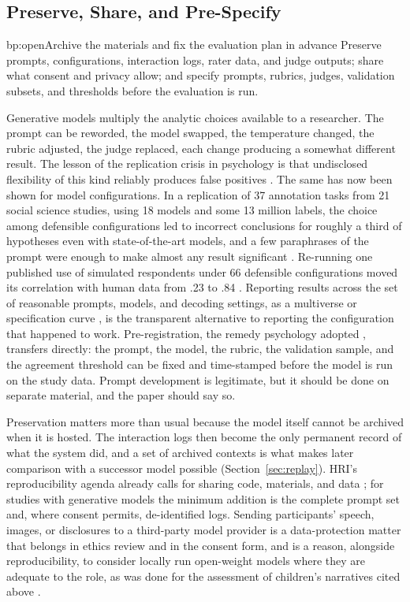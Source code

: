 \subsection{Preserve, Share, and Pre-Specify}

\begin{practice}{bp:open}{Archive the materials and fix the evaluation plan in advance}
Preserve prompts, configurations, interaction logs, rater data, and judge
outputs; share what consent and privacy allow; and specify prompts, rubrics,
judges, validation subsets, and thresholds before the evaluation is run.
\end{practice}

Generative models multiply the analytic choices available to a researcher.
The prompt can be reworded, the model swapped, the temperature changed, the
rubric adjusted, the judge replaced, each change producing a somewhat
different result. The lesson of the replication crisis in psychology is that
undisclosed flexibility of this kind reliably produces false positives
\cite{simmons2011falsepositive}. The same has now been shown for model
configurations. In a replication of 37 annotation tasks from 21 social
science studies, using 18 models and some 13 million labels, the choice
among defensible configurations led to incorrect conclusions for roughly a
third of hypotheses even with state-of-the-art models, and a few
paraphrases of the prompt were enough to make almost any result significant
\cite{baumann2025large}. Re-running one published use of simulated
respondents under 66 defensible configurations moved its correlation with
human data from .23 to .84 \cite{cummins2026threat}. Reporting results
across the set of reasonable prompts, models, and decoding settings, as a
multiverse or specification curve
\cite{steegen2016increasing,simonsohn2020specification}, is the transparent
alternative to reporting the configuration that happened to work.
Pre-registration, the remedy psychology adopted \cite{nosek2018preregistration},
transfers directly: the prompt, the model, the rubric, the validation sample,
and the agreement threshold can be fixed and time-stamped before the model is
run on the study data. Prompt development is legitimate, but it should be
done on separate material, and the paper should say so.

Preservation matters more than usual because the model itself cannot be
archived when it is hosted. The interaction logs then become the only
permanent record of what the system did, and a set of archived contexts is
what makes later comparison with a successor model possible
(Section~\ref{sec:replay}). HRI's reproducibility agenda already calls for
sharing code, materials, and data \cite{gunes2022reproducibility}; for
studies with generative models the minimum addition is the complete prompt
set and, where consent permits, de-identified logs. Sending participants'
speech, images, or disclosures to a third-party model provider is a
data-protection matter that belongs in ethics review and in the consent form,
and is a reason, alongside reproducibility, to consider locally run
open-weight models where they are adequate to the role, as was done for the
assessment of children's narratives cited above \cite{abbasi2025robotled}.

